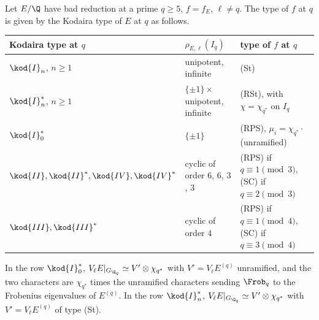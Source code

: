 \begin{proposition}\label{prop:modgalrep:kodaira-dictionary}
Let $E/\Q$ have bad reduction at a prime $q\ge5$, $f=f_E$, $\ell\ne q$. The type of $f$ at $q$ is given by the Kodaira type of $E$ at $q$ as follows.
\begin{center}\small
\begin{tabular}{@{}lll@{}}
\toprule
Kodaira type at $q$ & $\rho_{E,\ell}(I_q)$ & type of $f$ at $q$\\
\midrule
$\kod{I}_n$, $n\ge1$ & unipotent, infinite & (St)\\
$\kod{I}_n^*$, $n\ge1$ & $\{\pm1\}\times$unipotent, infinite & (RSt), with $\chi=\chi_{q^*}$ on $I_q$\\
$\kod{I}_0^*$ & $\{\pm1\}$ & (RPS), $\mu_i=\chi_{q^*}\cdot$(unramified)\\
$\kod{II},\kod{II}^*,\kod{IV},\kod{IV}^*$ & cyclic of order $6$, $6$, $3$, $3$ & (RPS) if $q\equiv1\pmod3$, (SC) if $q\equiv2\pmod3$\\
$\kod{III},\kod{III}^*$ & cyclic of order $4$ & (RPS) if $q\equiv1\pmod4$, (SC) if $q\equiv3\pmod4$\\
\bottomrule
\end{tabular}
\end{center}
In the row $\kod{I}_0^*$, $V_\ell E|_{G_{\Q_q}}\simeq V'\otimes\chi_{q^*}$ with $V'=V_\ell E^{(q)}$ unramified, and the two characters are $\chi_{q^*}$ times the unramified characters sending
$\Frob_q$ to the Frobenius eigenvalues of $E^{(q)}$. In the row $\kod{I}_n^*$, $V_\ell E|_{G_{\Q_q}}\simeq V'\otimes\chi_{q^*}$ with $V'=V_\ell E^{(q)}$ of type (St).
\end{proposition}

